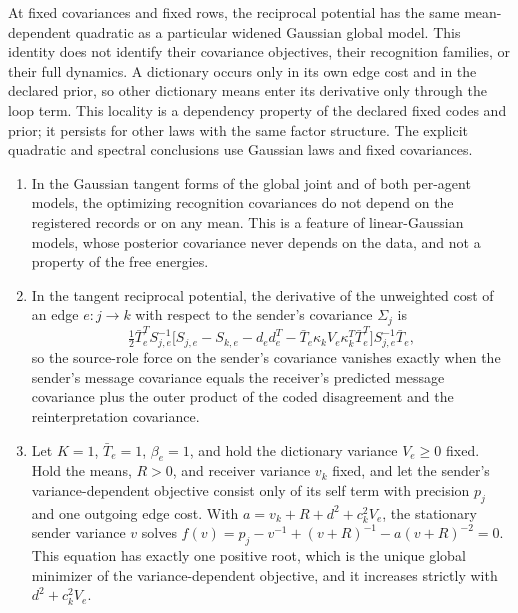 \documentclass[11pt,letterpaper]{report}
\begin{document}
At fixed covariances and fixed rows, the reciprocal potential has the same mean-dependent quadratic as a particular widened Gaussian global model. This identity does not identify their covariance objectives, their recognition families, or their full dynamics. A dictionary occurs only in its own edge cost and in the declared prior, so other dictionary means enter its derivative only through the loop term. This locality is a dependency property of the declared fixed codes and prior; it persists for other laws with the same factor structure. The explicit quadratic and spectral conclusions use Gaussian laws and fixed covariances.

\begin{enumerate}
\item[(i)] In the Gaussian tangent forms of the global joint and of both per-agent models, the optimizing recognition covariances do not depend on the registered records or on any mean. This is a feature of linear-Gaussian models, whose posterior covariance never depends on the data, and not a property of the free energies.
\item[(ii)] In the tangent reciprocal potential, the derivative of the unweighted cost of an edge $e:j\to k$ with respect to the sender's covariance $\Sigma_j$ is
\begin{equation}
\tfrac12\bar T_e^TS_{j,e}^{-1}\bigl[S_{j,e}-S_{k,e}-d_ed_e^T-\bar T_e\kappa_kV_e\kappa_k^T\bar T_e^T\bigr]S_{j,e}^{-1}\bar T_e,
\label{it2:source-covariance}
\end{equation}
so the source-role force on the sender's covariance vanishes exactly when the sender's message covariance equals the receiver's predicted message covariance plus the outer product of the coded disagreement and the reinterpretation covariance.
\item[(iii)] Let $K=1$, $\bar T_e=1$, $\beta_e=1$, and hold the dictionary variance $V_e\geq0$ fixed. Hold the means, $R>0$, and receiver variance $v_k$ fixed, and let the sender's variance-dependent objective consist only of its self term with precision $p_j$ and one outgoing edge cost. With $a=v_k+R+d^2+c_k^2V_e$, the stationary sender variance $v$ solves $f(v)=p_j-v^{-1}+(v+R)^{-1}-a(v+R)^{-2}=0$. This equation has exactly one positive root, which is the unique global minimizer of the variance-dependent objective, and it increases strictly with $d^2+c_k^2V_e$.
\end{enumerate}
\end{document}
